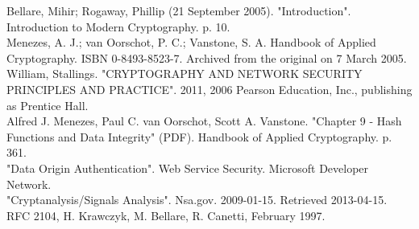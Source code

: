 \documentclass[12pt,a4paper,oneside]{report}
\begin{document}
\noindent [3] Bellare, Mihir; Rogaway, Phillip (21 September 2005). "Introduction". Introduction to Modern Cryptography. p. 10.\\

\noindent [4] Menezes, A. J.; van Oorschot, P. C.; Vanstone, S. A. Handbook of Applied Cryptography. ISBN 0-8493-8523-7. Archived from the original on 7 March 2005.\\

\noindent [5] William, Stallings. "CRYPTOGRAPHY AND NETWORK SECURITY PRINCIPLES AND PRACTICE". 2011, 2006 Pearson Education, Inc., publishing as Prentice Hall.\\

\noindent [6] Alfred J. Menezes, Paul C. van Oorschot, Scott A. Vanstone. "Chapter 9 - Hash Functions and Data Integrity" (PDF). Handbook of Applied Cryptography. p. 361.\\
\noindent [7] "Data Origin Authentication". Web Service Security. Microsoft Developer Network.\\

\noindent [8] "Cryptanalysis/Signals Analysis". Nsa.gov. 2009-01-15. Retrieved 2013-04-15.\\

\noindent [9] RFC 2104, H. Krawczyk, M. Bellare, R. Canetti, February 1997.\\
\end{document}
